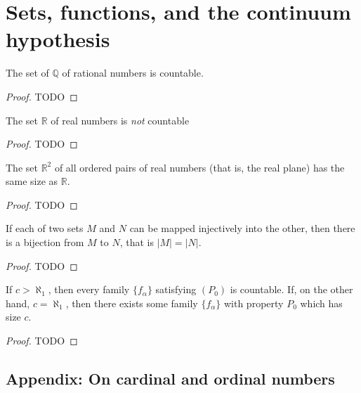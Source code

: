 \chapter{Sets, functions, and the continuum hypothesis}

\begin{theorem}
  \label{ch19theorem1}
  The set of \(\mathbb{Q}\) of rational numbers is countable.
\end{theorem}
\begin{proof}
  TODO
\end{proof}

\begin{theorem}
  \label{ch19theorem2}
  The set \(\mathbb{R}\) of real numbers is \emph{not} countable
\end{theorem}
\begin{proof}
  TODO
\end{proof}

\begin{theorem}
  \label{ch19theorem3}
  The set  \(\mathbb{R}^2\) of all ordered pairs of real numbers (that is, the
  real plane) has the same size as \(\mathbb{R}\).
\end{theorem}
\begin{proof}
  TODO
\end{proof}

\begin{theorem}
  \label{ch19theorem4}
  If each of two sets \(M\) and \(N\) can be mapped injectively into
  the other, then there is a bijection from \(M\) to \(N\), that is \(|M| = |N|\).
\end{theorem}
\begin{proof}
  TODO
\end{proof}

\begin{theorem}
  \label{ch19theorem5}
  If \(c > \aleph_1\), then every family \(\{f_\alpha\}\) satisfying \((P_0)\) is countable.
  If, on the other hand, \(c = \aleph_1\), then there exists some family \(\{f_\alpha\}\) with
  property \(P_0\) which has size \(c\).
\end{theorem}
\begin{proof}
  TODO
\end{proof}

\section*{Appendix: On cardinal and ordinal numbers}


